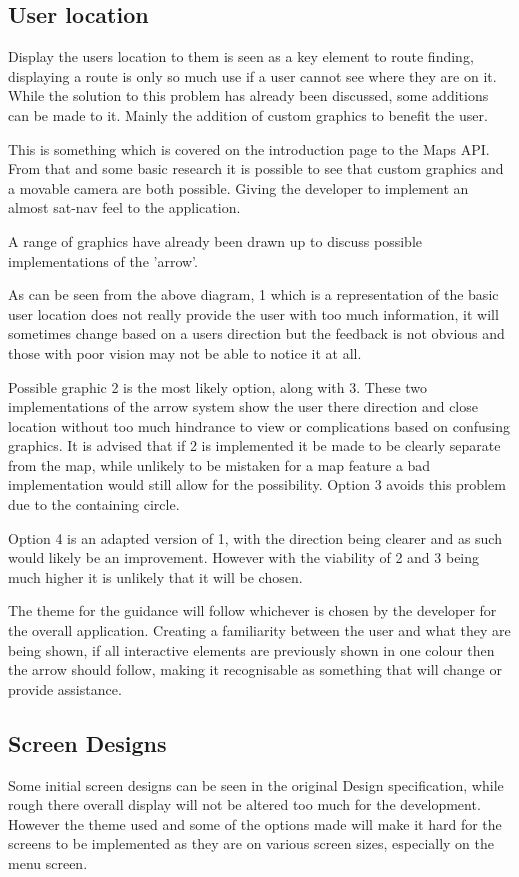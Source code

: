 \subsection{User location}
Display the users location to them is seen as a key element to route finding, displaying a route is only so much use if a user cannot see where they are on it. While the solution to this problem has already been discussed, some additions can be made to it. Mainly the addition of custom graphics to benefit the user. 

This is something which is covered on the introduction page to the Maps API. From that and some basic research it is possible to see that custom graphics and a movable camera are both possible. Giving the developer to implement an almost sat-nav feel to the application. 

A range of graphics have already been drawn up to discuss possible implementations of the 'arrow'.

As can be seen from the above diagram, 1 which is a representation of the basic user location does not really provide the user with too much information, it will sometimes change based on a users direction but the feedback is not obvious and those with poor vision may not be able to notice it at all. 

Possible graphic 2 is the most likely option, along with 3. These two implementations of the arrow system show the user there direction and close location without too much hindrance to view or complications based on confusing graphics. It is advised that if 2 is implemented it be made to be clearly separate from the map, while unlikely to be mistaken for a map feature a bad implementation would still allow for the possibility. Option 3 avoids this problem due to the containing circle.

Option 4 is an adapted version of 1, with the direction being clearer and as such would likely be an improvement. However with the viability of 2 and 3 being much higher it is unlikely that it will be chosen.

The theme for the guidance will follow whichever is chosen by the developer for the overall application. Creating a familiarity between the user and what they are being shown, if all interactive elements are previously shown in one colour then the arrow should follow, making it recognisable as something that will change or provide assistance. 
\subsection{Screen Designs}
Some initial screen designs can be seen in the original Design specification, while rough there overall display will not be altered too much for the development. However the theme used and some of the options made will make it hard for the screens to be implemented as they are on various screen sizes, especially on the menu screen.

